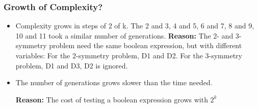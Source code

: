 \begin{frame}
\frametitle{
Growth of Complexity?
}
\begin{itemize}
\item Complexity grows in steps of 2 of k.
       The 2 and 3, 4 and 5, 6 and 7, 8 and 9, 10 and 11 took 
       a similar number of generations.
{\bf Reason:}
       The 2- and 3-symmetry problem need the same boolean expression,
       but with different variables:
       For the 2-symmetry problem, D1 and D2.
       For the 3-symmetry problem, D1 and D3,
       D2 is ignored.
\item The number of generations grows slower than the time needed.
 
  {\bf Reason:} The cost of testing a boolean expression grows with $2^k$
 
\end{itemize}
\end{frame}
